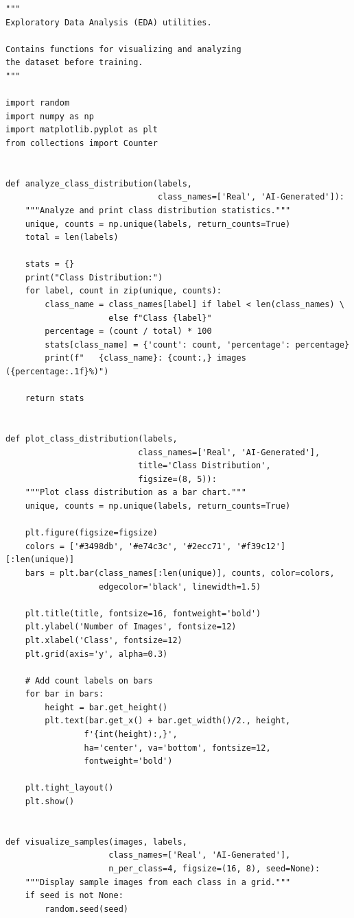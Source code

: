 \documentclass[man,12pt,letterpaper,donotrepeattitle,floatsintext]{apa7}
\begin{document}
\begin{lstlisting}[style=pythonstyle]
"""
Exploratory Data Analysis (EDA) utilities.

Contains functions for visualizing and analyzing 
the dataset before training.
"""

import random
import numpy as np
import matplotlib.pyplot as plt
from collections import Counter


def analyze_class_distribution(labels, 
                               class_names=['Real', 'AI-Generated']):
    """Analyze and print class distribution statistics."""
    unique, counts = np.unique(labels, return_counts=True)
    total = len(labels)
    
    stats = {}
    print("Class Distribution:")
    for label, count in zip(unique, counts):
        class_name = class_names[label] if label < len(class_names) \
                     else f"Class {label}"
        percentage = (count / total) * 100
        stats[class_name] = {'count': count, 'percentage': percentage}
        print(f"   {class_name}: {count:,} images ({percentage:.1f}%)")
    
    return stats


def plot_class_distribution(labels, 
                           class_names=['Real', 'AI-Generated'], 
                           title='Class Distribution', 
                           figsize=(8, 5)):
    """Plot class distribution as a bar chart."""
    unique, counts = np.unique(labels, return_counts=True)
    
    plt.figure(figsize=figsize)
    colors = ['#3498db', '#e74c3c', '#2ecc71', '#f39c12'][:len(unique)]
    bars = plt.bar(class_names[:len(unique)], counts, color=colors, 
                   edgecolor='black', linewidth=1.5)
    
    plt.title(title, fontsize=16, fontweight='bold')
    plt.ylabel('Number of Images', fontsize=12)
    plt.xlabel('Class', fontsize=12)
    plt.grid(axis='y', alpha=0.3)
    
    # Add count labels on bars
    for bar in bars:
        height = bar.get_height()
        plt.text(bar.get_x() + bar.get_width()/2., height,
                f'{int(height):,}',
                ha='center', va='bottom', fontsize=12, 
                fontweight='bold')
    
    plt.tight_layout()
    plt.show()


def visualize_samples(images, labels, 
                     class_names=['Real', 'AI-Generated'],
                     n_per_class=4, figsize=(16, 8), seed=None):
    """Display sample images from each class in a grid."""
    if seed is not None:
        random.seed(seed)
    

\end{lstlisting}
\end{document}
